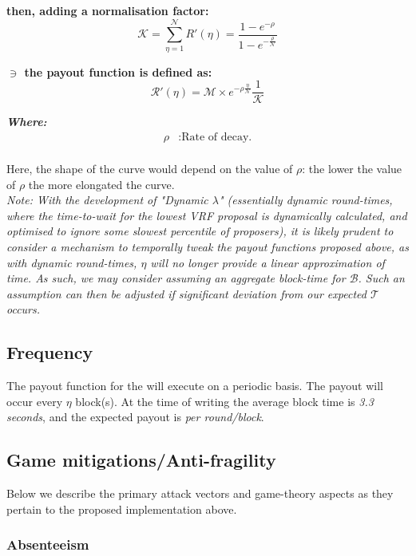 \documentclass[11pt,a4paper]{article}
\begin{document}
\textbf{then, adding a normalisation factor:}
\[
\mathcal{K} = \sum_{\eta=1}^\mathcal{N}R'(\eta)= \frac{1-e^{-\rho}}{1-e^{-\frac{\rho}{\mathcal{N}}}}
\]

\textbf{$\ni$ the payout function is defined as:}
\[
\mathcal{R'}(\eta)= \mathcal{M}\times e^{-\rho\frac{\eta}{\mathcal{N}}} \frac{1}{\mathcal{K}}
\]

\textbf{\emph{Where:}}
\begin{align*}
\rho & : \text{Rate of decay.} \\
\end{align*}

Here, the shape of the curve would depend on the value of \(\rho\): the lower the value of \(\rho\) the more elongated 
the curve. \\

\emph{Note: With the development of "Dynamic $\lambda$" (essentially dynamic round-times, where the time-to-wait for the
lowest VRF proposal is dynamically calculated, and optimised to ignore some slowest percentile of proposers), it is 
likely prudent to consider a mechanism to temporally tweak the payout functions proposed above, as with dynamic 
round-times, $\eta$ will no longer provide a linear approximation of time. As such, we may consider assuming an 
aggregate block-time for $\mathcal{B}$. Such an assumption can then be adjusted if significant deviation from our 
expected $\mathcal{T}$ occurs.}

\subsection{Frequency}
The payout function for the  will execute on a periodic basis. The payout will occur every 
$\eta$ block(s). At the time of writing the average block time is \emph{3.3 seconds}, and the expected payout is 
\textit{per round/block}. 

\pagebreak

\subsection{Game mitigations/Anti-fragility}
Below we describe the primary attack vectors and game-theory aspects as they pertain to the proposed implementation 
above.

\subsubsection{Absenteeism} \label{subsubsec:absenteeism}
\end{document}
